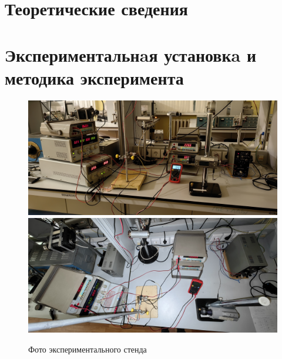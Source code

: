 \documentclass[a4paper, 12pt]{article}
\begin{document}

\section{Теоретические сведения}


\newpage


\section{Экспериментальнaя установкa и методика эксперимента}

\begin{figure}[H]
        \centering
        \includegraphics[scale=0.08]{./pics/setup_ph.jpg}
        \\
        \includegraphics[scale=0.08]{./pics/setup_ph_up.jpg}
        \caption{Фото экспериментального стенда}
        \label{ris:setup_ph}
\end{figure}
\end{document}
